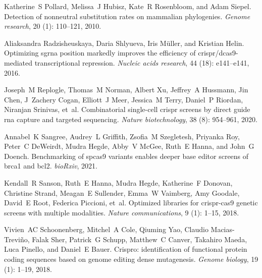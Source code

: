 \documentclass[pdftex,english,10pt]{article}
\begin{document}
{\begin{thebibliography}{105}
Katherine~S Pollard, Melissa~J Hubisz, Kate~R Rosenbloom, and Adam Siepel.
\newblock Detection of nonneutral substitution rates on mammalian phylogenies.
\newblock \emph{Genome research}, 20 (1): 110--121, 2010.

Aliaksandra Radzisheuskaya, Daria Shlyueva, Iris M{\"u}ller, and Kristian
  Helin.
\newblock Optimizing sgrna position markedly improves the efficiency of
  crispr/dcas9-mediated transcriptional repression.
\newblock \emph{Nucleic acids research}, 44 (18): e141--e141,
  2016.

Joseph~M Replogle, Thomas~M Norman, Albert Xu, Jeffrey~A Hussmann, Jin Chen,
  J~Zachery Cogan, Elliott~J Meer, Jessica~M Terry, Daniel~P Riordan, Niranjan
  Srinivas, et~al.
\newblock Combinatorial single-cell crispr screens by direct guide rna capture
  and targeted sequencing.
\newblock \emph{Nature biotechnology}, 38 (8): 954--961,
  2020.

Annabel~K Sangree, Audrey~L Griffith, Zsofia~M Szegletesh, Priyanka Roy,
  Peter~C DeWeirdt, Mudra Hegde, Abby~V McGee, Ruth~E Hanna, and John~G Doench.
\newblock Benchmarking of spcas9 variants enables deeper base editor screens of
  brca1 and bcl2.
\newblock \emph{bioRxiv}, 2021.

Kendall~R Sanson, Ruth~E Hanna, Mudra Hegde, Katherine~F Donovan, Christine
  Strand, Meagan~E Sullender, Emma~W Vaimberg, Amy Goodale, David~E Root,
  Federica Piccioni, et~al.
\newblock Optimized libraries for crispr-cas9 genetic screens with multiple
  modalities.
\newblock \emph{Nature communications}, 9 (1): 1--15, 2018.

Vivien~AC Schoonenberg, Mitchel~A Cole, Qiuming Yao, Claudio
  Macias-Trevi{\~n}o, Falak Sher, Patrick~G Schupp, Matthew~C Canver, Takahiro
  Maeda, Luca Pinello, and Daniel~E Bauer.
\newblock Crispro: identification of functional protein coding sequences based
  on genome editing dense mutagenesis.
\newblock \emph{Genome biology}, 19 (1): 1--19, 2018.


\end{thebibliography}}
\end{document}
